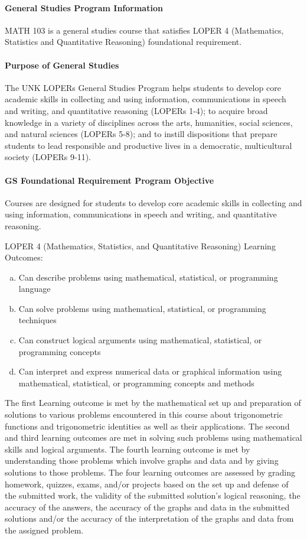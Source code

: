 \documentclass[12pt]{article}
\newcounter{ex}\setcounter{ex}{0}
\newenvironment{alphalist}{
  \begin{enumerate}[(a)]
    \addtolength{\itemsep}{-0.5\itemsep}}
  {\end{enumerate}}
\begin{document}
\paragraph{General Studies Program Information}

MATH 103 is a general studies course that satisfies LOPER 4 (Mathematics, Statistics and Quantitative Reasoning) foundational requirement. 

\paragraph{Purpose of General Studies} The UNK LOPERs General Studies Program helps students to develop core academic skills in collecting and using information, communications in speech and writing, and quantitative reasoning (LOPERs 1-4); to acquire broad knowledge in a variety of disciplines across the arts, humanities, social sciences, and natural sciences (LOPERs 5-8); and to instill dispositions that prepare students to lead responsible and productive lives in a democratic, multicultural society (LOPERs 9-11).

\paragraph{GS Foundational Requirement Program Objective} Courses 
are designed for students to develop core academic skills in 
collecting and using information, communications in speech and 
writing, and quantitative reasoning.

LOPER 4 (Mathematics, Statistics, and Quantitative Reasoning) Learning Outcomes: 
\begin{alphalist}
    \item  Can describe problems using mathematical, statistical, or programming language 
     \item Can solve problems using mathematical, statistical, or programming techniques 
    \item Can construct logical arguments using mathematical, statistical, or programming concepts 
     \item Can interpret and express numerical data or graphical information using mathematical, statistical, or programming concepts and methods
        \end{alphalist}

The first Learning outcome is met by the mathematical set up and 
preparation of solutions to various problems encountered in this 
course about trigonometric functions and trigonometric identities 
as well as their applications. The second and third learning 
outcomes are met in solving such problems using mathematical 
skills and logical arguments. The fourth learning outcome is met 
by understanding those problems which involve graphs and data and by 
giving solutions to those problems. The four learning outcomes are 
assessed by grading homework, quizzes, exams, and/or projects based 
on the set up and defense of the submitted work, the validity of the 
submitted solution’s logical reasoning, the accuracy of the answers, 
the accuracy of the graphs and data in the submitted solutions 
and/or the accuracy of the interpretation 
of the graphs and data from the assigned problem.
\end{document}
